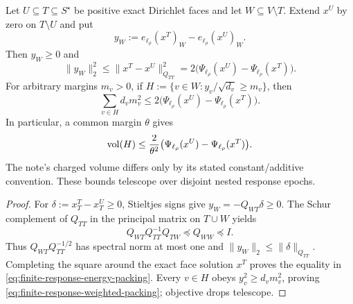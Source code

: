 \begin{lemma}
\label{lem:finite-response-energy-packing}
Let $U\subseteq T\subseteq S^\star$ be positive exact Dirichlet faces and
let $W\subseteq V\setminus T$.  Extend $x^U$ by zero on $T\setminus U$ and
put
\begin{equation*}
 y_W:=e_{\ell_\rho}(x^T)_W-e_{\ell_\rho}(x^U)_W.
\end{equation*}
Then $y_W\geq0$ and
\begin{equation}
 \|y_W\|_2^2
 \leq\|x^T-x^U\|_{Q_{TT}}^2
 =2\bigl(\Psi_{\ell_\rho}(x^U)-\Psi_{\ell_\rho}(x^T)\bigr).
 \label{eq:finite-response-energy-packing}
\end{equation}
For arbitrary margins $m_v>0$, if
$H:=\{v\in W:y_v/\sqrt{d_v}\geq m_v\}$, then
\begin{equation}
 \sum_{v\in H}d_vm_v^2
 \leq2\bigl(\Psi_{\ell_\rho}(x^U)-\Psi_{\ell_\rho}(x^T)\bigr).
 \label{eq:finite-response-weighted-packing}
\end{equation}
In particular, a common margin $\theta$ gives
\begin{equation*}
 \operatorname{vol}(H)\leq
 \frac{2}{\theta^2}
 \bigl(\Psi_{\ell_\rho}(x^U)-\Psi_{\ell_\rho}(x^T)\bigr).
\end{equation*}
The note's charged volume differs only by its stated constant/additive
convention.  These bounds telescope over disjoint nested response epochs.
\end{lemma}

\begin{proof}
For $\delta:=x^T_T-x^U_T\geq0$, Stieltjes signs give
$y_W=-Q_{WT}\delta\geq0$.  The Schur complement of $Q_{TT}$ in the principal
matrix on $T\cup W$ yields
\begin{equation*}
 Q_{WT}Q_{TT}^{-1}Q_{TW}\preceq Q_{WW}\preceq I.
\end{equation*}
Thus $Q_{WT}Q_{TT}^{-1/2}$ has spectral norm at most one and
$\|y_W\|_2\leq\|\delta\|_{Q_{TT}}$.  Completing the square around the exact
face solution $x^T$ proves the equality in
\cref{eq:finite-response-energy-packing}.  Every $v\in H$ obeys
$y_v^2\geq d_vm_v^2$, proving
\cref{eq:finite-response-weighted-packing}; objective drops telescope.
\end{proof}

